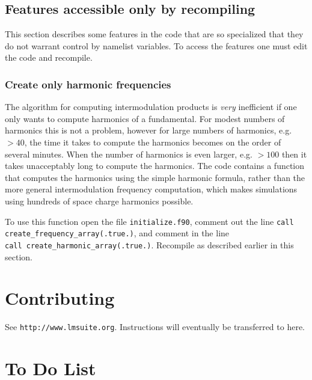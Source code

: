 \documentclass{article}
\begin{document}
\subsection{Features accessible only by recompiling}
This section describes some features in the code that are so specialized
that they do not warrant control by namelist variables. To access the features
one must edit the code and recompile.

\subsubsection{Create only harmonic frequencies}
The algorithm for computing
intermodulation products is {\em very} inefficient if one only wants to
compute harmonics of a fundamental. For modest numbers of harmonics this
is not a problem, however for large numbers of harmonics, e.g. $> 40$,
the time it takes to compute the harmonics becomes on the order of several
minutes. When the number of harmonics is even larger, e.g. $>100$ then
it takes unacceptably long to compute the harmonics. The code contains
a function that computes the harmonics using the simple harmonic formula,
rather than the more general intermodulation frequency computation,
which makes simulations using hundreds of space charge harmonics possible.

To use this function open the file {\tt initialize.f90}, comment
out the line {\tt call create\_frequency\_array(.true.)}, and comment
in the line\\
{\tt call create\_harmonic\_array(.true.)}. Recompile as
described earlier in this section.


\section{Contributing}
See {\tt http://www.lmsuite.org}. Instructions
will eventually be transferred to here.


\section{To Do List}
\end{document}
